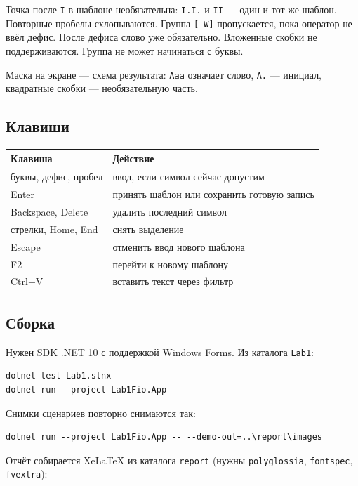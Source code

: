 \documentclass[a4paper,14pt]{extarticle}
\begin{document}
Точка после \texttt{I} в шаблоне необязательна: \texttt{I.I.} и \texttt{II} --- один и тот же шаблон. Повторные пробелы схлопываются. Группа \texttt{[-W]} пропускается, пока оператор не ввёл дефис. После дефиса слово уже обязательно. Вложенные скобки не поддерживаются. Группа не может начинаться с буквы.

Маска на экране --- схема результата: \texttt{Ааа} означает слово, \texttt{А.} --- инициал, квадратные скобки --- необязательную часть.

\subsection{Клавиши}

\begin{center}
\begin{tabular}{ll}
\toprule
Клавиша & Действие\\
\midrule
буквы, дефис, пробел & ввод, если символ сейчас допустим\\
Enter & принять шаблон или сохранить готовую запись\\
Backspace, Delete & удалить последний символ\\
стрелки, Home, End & снять выделение\\
Escape & отменить ввод нового шаблона\\
F2 & перейти к новому шаблону\\
Ctrl+V & вставить текст через фильтр\\
\bottomrule
\end{tabular}
\end{center}

\subsection{Сборка}

Нужен SDK .NET 10 с поддержкой Windows Forms. Из каталога \texttt{Lab1}:

\begin{Verbatim}
dotnet test Lab1.slnx
dotnet run --project Lab1Fio.App
\end{Verbatim}

Снимки сценариев повторно снимаются так:

\begin{Verbatim}
dotnet run --project Lab1Fio.App -- --demo-out=..\report\images
\end{Verbatim}

Отчёт собирается XeLaTeX из каталога \texttt{report} (нужны \texttt{polyglossia}, \texttt{fontspec}, \texttt{fvextra}):
\end{document}
